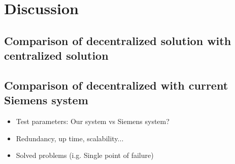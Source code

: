 \chapter{Discussion}

\section{Comparison of decentralized solution with centralized solution}

\section{Comparison of decentralized with current Siemens system}

\begin{itemize}
	\item Test parameters: Our system vs Siemens system?
	\item Redundancy, up time, scalability...
	\item Solved problems (i.g. Single point of failure)
\end{itemize}